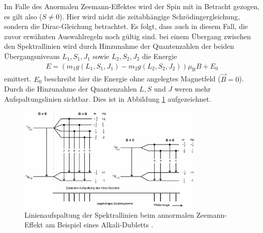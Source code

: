 Im Falle des Anormalen Zeemann-Effektes wird der Spin mit in Betracht gezogen, es
gilt also ($S \neq \num{0}$). Hier wird nicht die zeitabhängige Schrödingergleichung,
sondern die Dirac-Gleichung betrachtet. Es folgt, dass auch in diesem Fall, die
zuvor erwähnten Auswahlregeln noch gültig sind.
bei einem Übergang zwischen den Spektrallinien wird durch Hinzunahme der Quantenzahlen
der beiden Übergangsniveaus $L_1, S_1, J_1$ sowie $L_2, S_2, J_2$  die Energie
\begin{align}
  E = \left(m_1 g(L_1, S_1, J_1) - m_2 g(L_2, S_2, J_2) \right)\mu_\text{B} B + E_0
\end{align}
emittert. $E_0$ beschreibt hier die Energie ohne angelegtes Magnetfeld ($\vec{B} = \num{0}$).
Durch die Hinzunahme der Quantenzahlen $L, S$ und $J$ weren mehr Aufspaltungslinien
sichtbar. Dies ist in Abbildung \ref{abb:anormal} aufgezeichnet.
\begin{figure}[htb]
  \centering
  \includegraphics[width=0.8\textwidth]{images/V27_5.pdf}
  \caption{Linienaufspaltung der Spektrallinien beim annormalen Zeemann-Effekt
  am Beispiel eines Alkali-Dubletts \cite{anleitung}.}
  \label{abb:anormal}
\end{figure}
